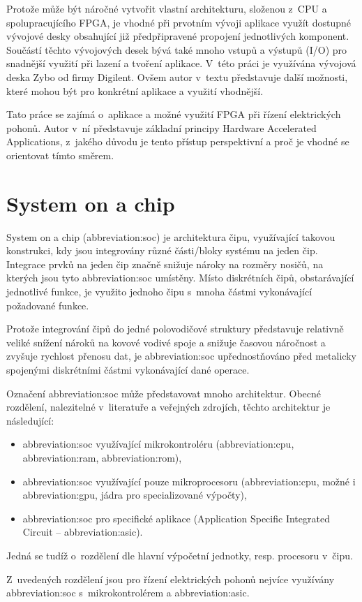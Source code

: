 \documentclass[a4paper, twoside, 11pt]{article}
\begin{document}
Protože může být náročné vytvořit vlastní architekturu, složenou z~CPU a spolupracujícího FPGA, je vhodné při prvotním vývoji aplikace využít dostupné vývojové desky obsahující již předpřipravené propojení jednotlivých komponent. Součástí těchto vývojových desek bývá také mnoho vstupů a výstupů (I/O) pro snadnější využití při lazení a tvoření aplikace. V~této práci je využívána vývojová deska Zybo od firmy Digilent. Ovšem autor v~textu představuje další možnosti, které mohou být pro konkrétní aplikace a využití vhodnější.\par
Tato práce se zajímá o~aplikace a možné využití FPGA při řízení elektrických pohonů. Autor v~ní představuje základní principy Hardware Accelerated Applications, z~jakého důvodu je tento přístup perspektivní a proč je vhodné se orientovat tímto směrem.\par
\flushbottom %
\newpage

\section{System on a chip}\label{sec:system-on-a-chip}
	System on a chip (\gls{abbreviation:soc}) je architektura čipu, využívající takovou konstrukci, kdy jsou integrovány různé části/bloky systému na jeden čip. Integrace prvků na jeden čip značně snižuje nároky na rozměry nosičů, na kterých jsou tyto \gls{abbreviation:soc} umístěny. Místo diskrétních čipů, obstarávající jednotlivé funkce, je využito jednoho čipu s~mnoha částmi vykonávající požadované funkce.\par
	Protože integrování čipů do jedné polovodičové struktury představuje relativně veliké snížení nároků na kovové vodivé spoje a snižuje časovou náročnost a zvyšuje rychlost přenosu dat, je \gls{abbreviation:soc} upřednostňováno před metalicky spojenými diskrétními částmi vykonávající dané operace.\par
	Označení \gls{abbreviation:soc} může představovat mnoho architektur. Obecné rozdělení, nalezitelné v~literatuře a veřejných zdrojích, těchto architektur je následující:
	\begin{itemize}
		\item \gls{abbreviation:soc} využívající mikrokontroléru (\gls{abbreviation:cpu}, \gls{abbreviation:ram}, \gls{abbreviation:rom}),
		\item \gls{abbreviation:soc} využívající pouze mikroprocesoru (\gls{abbreviation:cpu}, možné i \gls{abbreviation:gpu}, jádra pro specializované výpočty),
		\item \gls{abbreviation:soc} pro specifické aplikace (Application Specific Integrated Circuit – \gls{abbreviation:asic}).
	\end{itemize}
	Jedná se tudíž o~rozdělení dle hlavní výpočetní jednotky, resp. procesoru v~čipu. \cite{tomshardware-system-on-chip}\par
	Z~uvedených rozdělení jsou pro řízení elektrických pohonů nejvíce využívány \gls{abbreviation:soc} s~mikrokontrolérem a \gls{abbreviation:asic}.
\end{document}
